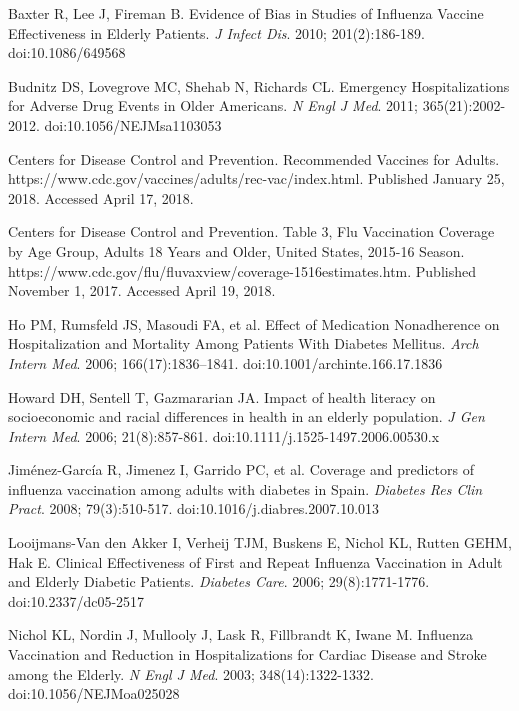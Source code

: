 \documentclass[english, 12pt]{article}
\begin{document}
\begin{thebibliography}{20}

 Baxter R, Lee J, Fireman B. Evidence of Bias in Studies of Influenza Vaccine Effectiveness in Elderly Patients. {\em J Infect Dis}. 2010; 201(2):186-189. doi:10.1086/649568

 Budnitz DS, Lovegrove MC, Shehab N, Richards CL. Emergency Hospitalizations for Adverse Drug Events in Older Americans. {\em N Engl J Med}. 2011; 365(21):2002-2012. doi:10.1056/NEJMsa1103053

 Centers for Disease Control and Prevention. Recommended Vaccines for Adults. https://www.cdc.gov/vaccines/adults/rec-vac/index.html. Published January 25, 2018. Accessed April 17, 2018.

 Centers for Disease Control and Prevention. Table 3, Flu Vaccination Coverage by Age Group, Adults 18 Years and Older, United States, 2015-16 Season. https://www.cdc.gov/flu/fluvaxview/coverage-1516estimates.htm. Published November 1, 2017. Accessed April 19, 2018.

 Ho PM, Rumsfeld JS, Masoudi FA, et al. Effect of Medication Nonadherence on Hospitalization and Mortality Among Patients With Diabetes Mellitus. {\em Arch Intern Med}. 2006; 166(17):1836–1841. doi:10.1001/archinte.166.17.1836

 Howard DH, Sentell T, Gazmararian JA. Impact of health literacy on socioeconomic and racial differences in health in an elderly population. {\em J Gen Intern Med}. 2006; 21(8):857-861. doi:10.1111/j.1525-1497.2006.00530.x

 Jiménez-García R, Jimenez I, Garrido PC, et al. Coverage and predictors of influenza vaccination among adults with diabetes in Spain. {\em Diabetes Res Clin Pract}. 2008; 79(3):510-517. doi:10.1016/j.diabres.2007.10.013

 Looijmans-Van den Akker I, Verheij TJM, Buskens E, Nichol KL, Rutten GEHM, Hak E. Clinical Effectiveness of First and Repeat Influenza Vaccination in Adult and Elderly Diabetic Patients. {\em Diabetes Care}. 2006; 29(8):1771-1776. doi:10.2337/dc05-2517

 Nichol KL, Nordin J, Mullooly J, Lask R, Fillbrandt K, Iwane M. Influenza Vaccination and Reduction in Hospitalizations for Cardiac Disease and Stroke among the Elderly. {\em N Engl J Med}. 2003; 348(14):1322-1332. doi:10.1056/NEJMoa025028


\end{thebibliography}
\end{document}
